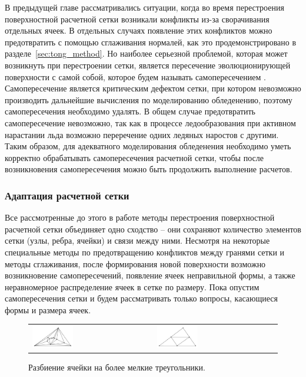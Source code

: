 В предыдущей главе рассматривались ситуации, когда во время перестроения поверхностной расчетной сетки возникали конфликты из-за сворачивания отдельных ячеек.
В отдельных случаях появление этих конфликтов можно предотвратить с помощью сглаживания нормалей, как это продемонстрировано в разделе~\ref{sec:tong_method}.
Но наиболее серьезной проблемой, которая может возникнуть при перестроении сетки, является пересечение эволюционирующей поверхности с самой собой, которое будем называть самопересечением \cite{Freylekhman2022GeoIntersect}.
Самопересечение является критическим дефектом сетки, при котором невозможно производить дальнейшие вычисления по моделированию обледенению, поэтому самопересечения необходимо удалять.
В общем случае предотвратить самопересечение невозможно, так как в процессе ледообразования при активном нарастании льда возможно переречение одних ледяных наростов с другими.
Таким образом, для адекватного моделирования обледенения необходимо уметь корректно обрабатывать самопересечения расчетной сетки, чтобы после возникновения самопересечения можно быть продолжить выполнение расчетов.

\subsubsection{Адаптация расчетной сетки}

Все рассмотренные до этого в работе методы перестроения поверхностной расчетной сетки объединяет одно сходство -- они сохраняют количество элементов сетки (узлы, ребра, ячейки) и связи между ними.
Несмотря на некоторые специальные методы по предотвращению конфликтов между гранями сетки и методы сглаживания, после формирования новой поверхности возможно возникновение самопересечений, появление ячеек неправильной формы, а также неравномерное распределение ячеек в сетке по размеру.
Пока опустим самопересечения сетки и будем рассматривать только вопросы, касающиеся формы и размера ячеек.

\begin{figure}[ht]
\centering
\begin{tabular}{ll}
\includegraphics[width=0.35\textwidth]{fig/int_delaunay.pdf}
&
\includegraphics[width=0.35\textwidth]{fig/int_tri_cut.pdf}
\end{tabular}
\singlespacing
{}\caption{Разбиение ячейки на более мелкие треугольники.}
\label{fig:text_1_int_cut}
\end{figure}

